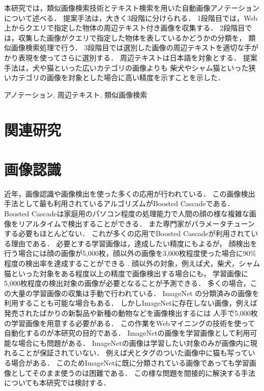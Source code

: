 \documentclass{deimj}
\begin{document}
\pagestyle{empty}
\begin{jabstract}
本研究では，類似画像検索技術とテキスト検索を用いた自動画像アノテーションについて述べる．
提案手法は，大きく3段階に分けられる．
1段階目では，Web上からクエリで指定した物体の周辺テキスト付き画像を収集する．
2段階目では，収集した画像がクエリで指定した物体を表しているかどうかの分類を，
類似画像検索処理で行う．
3段階目では選別した画像の周辺テキストを適切な手がかり表現を使ってさらに選別する．
周辺テキストは日本語を対象とする．
提案手法は，犬や猫といった広いカテゴリの画像よりも
柴犬やシャム猫といった狭いカテゴリの画像を対象とした場合に高い精度を示すことを示した．
\end{jabstract}
\begin{jkeyword}
アノテーション, 周辺テキスト, 類似画像検索
\end{jkeyword}
\maketitle


\section{関連研究}
\label{sec:related}

\section{画像認識}
\label{sec:rel-image}

近年，画像認識や画像検出を使った多くの応用が行われている．
この画像検出手法として最も利用されているアルゴリズムがBoosted Cascade\cite{Viola01rapidobject}である．
Boosted Cascadeは家庭用のパソコン程度の処理能力で人間の顔の様な複雑な画像をリアルタイムで検出することができる．
また専門家がパラメータチューンする必要もほとんどない．
これが多くの応用でBoosted Cascadeが利用されている理由である．
必要とする学習画像は，達成したい精度にもよるが，
顔検出を行う場合には顔の画像が5,000枚，顔以外の画像を3,000枚程度使った場合に90\%程度の検出率を達成することができる
\cite{Lienhart03empiricalanalysis}
.
顔以外の対象，例えば犬，柴犬，シャム猫といった対象をある程度以上の精度で画像検出する場合にも，
学習画像に5,000枚程度の検出対象の画像が必要となることが予測できる．
多くの場合，この大量の学習画像の収集は手動で行われている．
ImageNet\cite{imagenet}
の分類済みの画像を利用することも可能な場合もある．
しかしImageNetに存在しない画像，例えば発売されたばかりの新製品や新種の動物などを画像検出するには
人手で5,000枚の学習画像を用意する必要がある．
この作業をWebマイニングの技術を使って自動化するのが本研究の目的である．
ImageNetの画像を学習画像として利用可能な場合にも問題がある．
ImageNetの画像は学習したい対象のみが画像内に現れることが保証されていない．
例えば犬とタグのついた画像中に猫も写っている場合がある．
このためImageNetに既に分類されている画像であっても学習画像としてそのまま使うのは困難である．
この様な問題を間接的に解決する手法についても本研究では検討する．
\end{document}
